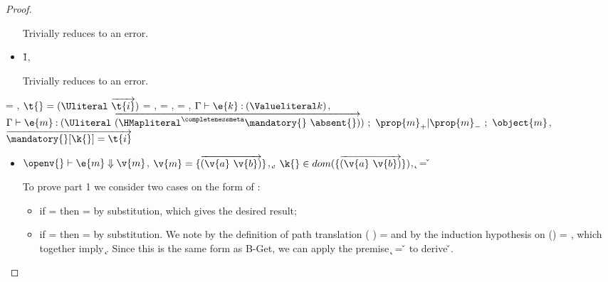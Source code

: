 \begin{lemma}
\begin{proof}
\begin{case}[T-IsA]
\begin{itemize}
\begin{subcase}[BE-IsA1]
        Trivially reduces to an error.
      \end{subcase}
    \item[]
      \begin{subcase}[BE-IsA2]
       \opsem {\openv{}} {} {\v{1}},
       \opsem {\openv{}} {} {\errorvalv{}}

        Trivially reduces to an error.
      \end{subcase}
  \end{itemize}
\end{case}

\begin{case}[T-GetHMap]
  \e{} = { {}},
  $\t{} = {\Unionsplice {\overrightarrow {\t{i}}}}$
  \thenprop{\prop{}} = {\topprop{}},
  \elseprop{\prop{}} = {\topprop{}},
  \object{} = {
                          {}
                          {\x{}}},
  $\judgementtwo {\propenv{}} {\e{k}} {\Value {k}}$,
  $\judgement {\propenv{}} {\e{m}} {\Unionsplice {\overrightarrow {\HMapgeneric {\mandatory{}} {\absent{}}}}}
           {\filterset {\thenprop {\prop{m}}} {\elseprop {\prop{m}}}}
           {\object{m}}$,
  $\overrightarrow{\inmandatory{\k{}}{\t{i}}{\mandatory{}}}$


  \begin{itemize}
    \item[]
      \begin{subcase}[B-Get]
      $\opsem {\openv{}} {\e{m}}{\v{m}}$,
        $\v{m} = {\curlymap{\overrightarrow{({\v{a}}\ {\v{b}})}}}$,
         \opsem {\openv{}} {} {\k{}},
         $\keyinmap{\k{}}{\curlymap{\overrightarrow{({\v{a}}\ {\v{b}})}}}$,
          {\k{}} = {\v{}}

         To prove part 1 we consider two cases on the form of : 
         \begin{itemize}
           \item
         if {} = \emptyobject{}
         then \object{} = \emptyobject{} by substitution, which gives the desired result;
           \item
         if  = { {}}
         then \object{} = { {}} by substitution.
         We note by the definition of path translation
         {\openv{}}({ {}}) =
         {}
         and by the induction hypothesis on 
         {{\openv{}}()} = {},
         which together imply 
         \inopenv {\openv{}} {\object{}} { {\k{}}}.
         Since this is the same form as B-Get, we can apply the premise
          {\k{}} = {\v{}}
         to derive \inopenv {\openv{}} {\object{}} {\v{}}.
         \end{itemize}
         

\end{subcase}
\end{itemize}
\end{case}
\end{proof}
\end{lemma}
